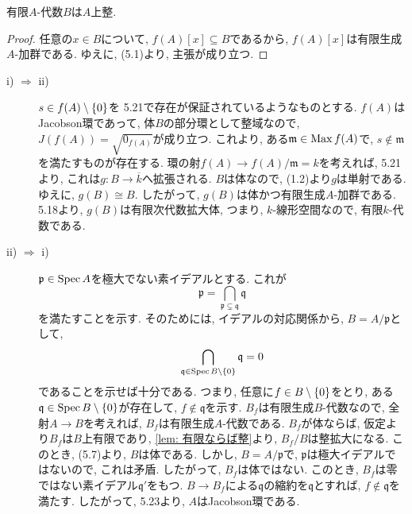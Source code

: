 \documentclass[dvipdfmx]{jsarticle}
\begin{document}
    \begin{lemma} \label{lem: 有限ならば整}
        有限$A$-代数$B$は$A$上整.
    \end{lemma}
    \begin{proof}
        任意の$x \in B$について, $f(A)[x] \subseteq B$であるから, $f(A)[x]$は有限生成$A$-加群である.
        ゆえに, (5.1)より, 主張が成り立つ.
    \end{proof}

    \begin{problem}
        \begin{description}
            \item[i) $\Rightarrow$ ii)]
            $s \in f(A) \setminus \{0\}$を
            5.21で存在が保証されているようなものとする.
            $f(A)$はJacobson環であって, 体$B$の部分環として整域なので,
            $J(f(A)) = \sqrt{0_{f(A)}}$が成り立つ.
            これより, ある$\mathfrak{m} \in \operatorname{Max}{f(A)}$で, $s \notin \mathfrak{m}$を満たすものが存在する.
            環の射$f(A) \to f(A)/\mathfrak{m} = k$を考えれば, 5.21より, これは$g:B \to \overline{k}$へ拡張される.
            $B$は体なので, (1.2)より$g$は単射である.
            ゆえに, $g(B) \cong B$.
            したがって, $g(B)$は体かつ有限生成$A$-加群である.
            5.18より, $g(B)$は有限次代数拡大体, つまり, $k$-線形空間なので, 有限$k$-代数である.
            \item[ii) $\Rightarrow$ i)]
            $\mathfrak{p} \in \operatorname{Spec}{A}$を極大でない素イデアルとする.
            これが
            \[
                \mathfrak{p} = \bigcap_{\mathfrak{p} \subsetneq \mathfrak{q}} \mathfrak{q}
            \]
            を満たすことを示す.
            そのためには, イデアルの対応関係から, $B = A/\mathfrak{p}$として,
            \[
                \bigcap_{\mathfrak{q} \in \operatorname{Spec}{B}\setminus\{0\}} \mathfrak{q} = 0
            \]
            であることを示せば十分である.
            つまり, 任意に$f \in B \setminus \{0\}$をとり, ある$\mathfrak{q} \in \operatorname{Spec}{B} \setminus \{0\}$が存在して, $f \notin \mathfrak{q}$を示す.
            $B_f$は有限生成$B$-代数なので, 全射$A \to B$を考えれば, $B_f$は有限生成$A$-代数である.
            $B_f$が体ならば, 仮定より$B_f$は$B$上有限であり, \cref{lem: 有限ならば整}より, $B_f/B$は整拡大になる.
            このとき, (5.7)より, $B$は体である.
            しかし, $B = A/\mathfrak{p}$で, $\mathfrak{p}$は極大イデアルではないので,
            これは矛盾.
            したがって, $B_f$は体ではない.
            このとき, $B_f$は零ではない素イデアル$\mathfrak{q}'$をもつ.
            $B \to B_f$による$\mathfrak{q}$の縮約を$\mathfrak{q}$とすれば, $f \notin \mathfrak{q}$を満たす.
            したがって, 5.23より, $A$はJacobson環である.
        \end{description}
    \end{problem}
\end{document}
